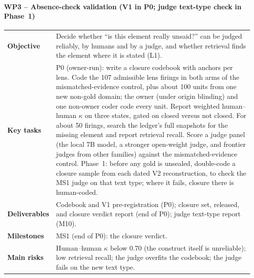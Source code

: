 \paragraph{WP3 -- Absence-check validation (V1 in P0; judge text-type check in Phase~1)}
\mbox{}\par
\begin{tabularx}{\linewidth}{@{}>{\bfseries}p{2.6cm}X@{}}
  \toprule
  Objective & Decide whether \enquote{is this element really unsaid?} can be judged reliably,
    by humans and by a judge, and whether retrieval finds the element where it is stated (L1). \\
  Key tasks & P0 (owner-run): write a closure codebook with anchors per lens. Code the 107
    admissible lens firings in both arms of the mismatched-evidence control, plus about 100 units from one new
    non-gold domain; the owner (under origin blinding) and one non-owner coder code every unit.
    Report weighted human--human $\kappa$ on three states, gated on closed versus not closed. For
    about 50 firings, search the ledger's full snapshots for the missing element and report
    retrieval recall. Score a judge panel (the local 7B model, a stronger open-weight judge, and
    frontier judges from other families) against the mismatched-evidence control. Phase~1: before any gold is
    unsealed, double-code a closure sample from each dated V2 reconstruction, to check the MS1
    judge on that text type; where it fails, closure there is human-coded. \\
  Deliverables & Codebook and V1 pre-registration (P0); closure set, released, and closure verdict
    report (end of P0); judge text-type report (M10). \\
  Milestones & MS1 (end of P0): the closure verdict. \\
  Main risks & Human--human $\kappa$ below 0.70 (the construct itself is unreliable); low
    retrieval recall; the judge overfits the codebook; the judge fails on the new text type. \\
  \bottomrule
\end{tabularx}

